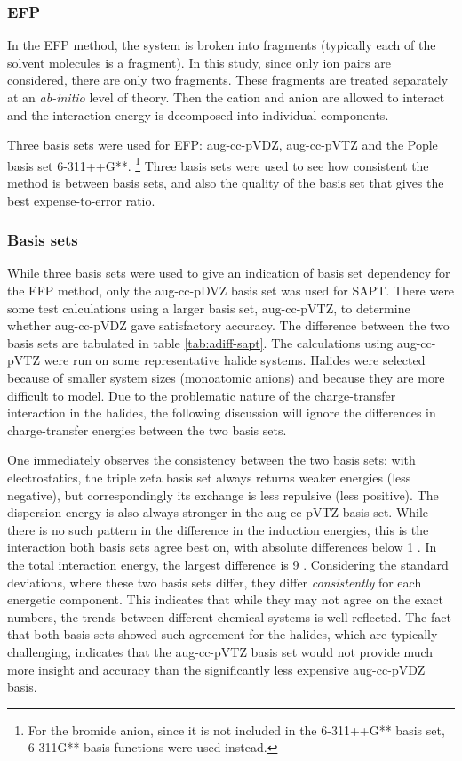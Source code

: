 
\subsubsection{EFP}

In the EFP method, the system is broken into fragments (typically each of the solvent molecules is a fragment). 
In this study, since only ion pairs are considered, there are only two fragments. 
These fragments are treated separately at an \emph{ab-initio} level of theory. 
Then the cation and anion are allowed to interact and the interaction energy is decomposed into individual components.

Three basis sets were used for EFP: aug-cc-pVDZ, aug-cc-pVTZ and the Pople basis set 6-311++G**. 
\footnote{For the bromide anion, since it is not included in the 6-311++G** basis set, 6-311G** basis functions were used instead.}
Three basis sets were used to see how consistent the method is between basis sets, and also the quality of the basis set that gives the best expense-to-error ratio.

\subsubsection{Basis sets}
While three basis sets were used to give an indication of basis set dependency for the EFP method, only the aug-cc-pDVZ basis set was used for SAPT. 
There were some test calculations using a larger basis set, aug-cc-pVTZ, to determine whether aug-cc-pVDZ gave satisfactory accuracy.
The difference between the two basis sets are tabulated in 
table \ref{tab:adiff-sapt}.
The calculations using aug-cc-pVTZ were run on some representative halide systems. 
Halides were selected because of smaller system sizes (monoatomic anions) and because they are more difficult to model. 
Due to the problematic nature of the charge-transfer interaction in the halides, the following discussion will ignore the differences in charge-transfer energies between the two basis sets.


One immediately observes the consistency between the two basis sets: with electrostatics, the triple zeta basis set always returns weaker energies (less negative), but correspondingly its exchange is less repulsive (less positive).
The dispersion energy is also always stronger in the aug-cc-pVTZ basis set. 
While there is no such pattern in the difference in the induction energies, this is the interaction both basis sets agree best on, with absolute differences below 1 \enUnit.
In the total interaction energy, the largest difference is 9 \enUnit. 
Considering the standard deviations, where these two basis sets differ, they differ \emph{consistently} for each energetic component. 
This indicates that while they may not agree on the exact numbers, the trends between different chemical systems is well reflected.
The fact that both basis sets showed such agreement for the halides, which are typically challenging, indicates that the aug-cc-pVTZ basis set would not provide much more insight and accuracy than the significantly less expensive aug-cc-pVDZ basis.


